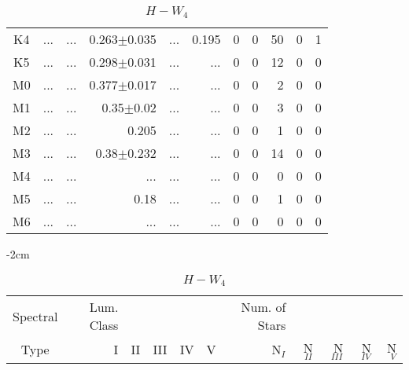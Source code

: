 \begin{table}[t]
\begin{table}[t]
\begin{center}
\begin{tabular}{c|rrrrr|rrrrr}
    K4	&	 ...	&	 ...	&	0.263$\pm$0.035	&	 ...	&	0.195	&	0	&	0	&	50	&	0	&	1	\\
    K5	&	 ...	&	 ...	&	0.298$\pm$0.031	&	 ...	&	 ...	&	0	&	0	&	12	&	0	&	0	\\
    M0	&	 ...	&	 ...	&	0.377$\pm$0.017	&	 ...	&	 ...	&	0	&	0	&	2	&	0	&	0	\\
    M1	&	 ...	&	 ...	&	0.35$\pm$0.02	&	 ...	&	 ...	&	0	&	0	&	3	&	0	&	0	\\
    M2	&	 ...	&	 ...	&	0.205	&	 ...	&	 ...	&	0	&	0	&	1	&	0	&	0	\\
    M3	&	 ...	&	 ...	&	0.38$\pm$0.232	&	 ...	&	 ...	&	0	&	0	&	14	&	0	&	0	\\
    M4	&	 ...	&	 ...	&	 ...	&	 ...	&	 ...	&	0	&	0	&	0	&	0	&	0	\\
    M5	&	 ...	&	 ...	&	0.18	&	 ...	&	 ...	&	0	&	0	&	1	&	0	&	0	\\
    M6	&	 ...	&	 ...	&	 ...	&	 ...	&	 ...	&	0	&	0	&	0	&	0	&	0	\\
        \bottomrule
        \end{tabular}
    \end{center}
    \end{table}
    
    
    \begin{table}[t]
    \tiny
    \centering
    \caption{$H-W_{4}$}
    \begin{center}
        \addtolength{\leftskip} {-2cm}
        \addtolength{\rightskip}{-2cm}
        \begin{tabular}{c|rrrrr|rrrrr}
        \toprule
        Spectral & Lum. Class & & & & & Num. of Stars & & & &  \\
        Type & I & II & III &  IV & V & N$_{I}$ & N$_{II}$ & N$_{III}$ & N$_{IV}$ & N$_{V}$ \\ \midrule
     

\end{tabular}
\end{center}
\end{table}
\end{table}

